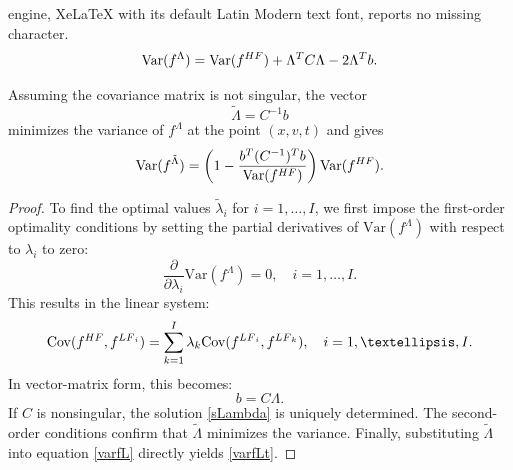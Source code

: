 \documentclass[10pt,a4paper]{amsart}
\newcommand{\Cov}{\mathrm{Cov}}
\newcommand{\Var}{\mathrm{Var}}
\begin{document}
engine, XeLaTeX with its default Latin Modern text font, reports no missing character.
\begin{equation}
\label{varfL}
  \Var{(f^{\Lambda})} = \Var{(f^{\rm HF})} + \Lambda^{\rm T} C\Lambda - 2\Lambda^{\rm T}b.
\end{equation}

\begin{lemma}
  Assuming the covariance matrix is not singular, the vector
  \begin{equation}
  \label{sLambda}
    \tilde{\Lambda} = C^{-1}b
  \end{equation}
  minimizes the variance of $f^{\Lambda}$ at the point $(x, v, t)$ and gives
  \begin{equation}
  \label{varfLt}
    \Var{(f^{\tilde{\Lambda}})} = \left(1 - \frac{b^{\rm T}(C^{-1})^{\rm T}b}{\Var{(f^{\rm HF})}} \right) \Var{(f^{\rm HF})}.
  \end{equation}
\end{lemma}

\begin{proof}
To find the optimal values $\tilde{\lambda}_i$ for \(i = 1, \ldots, I\), we first impose the first-order optimality conditions by setting the partial derivatives of $\Var\left(f^\Lambda\right)$ with respect to $\lambda_i$ to zero:
\begin{equation*}
  \frac{\partial}{\partial \lambda_i} \Var (f^\Lambda) = 0, \quad i = 1, \ldots, I.
\end{equation*}
This results in the linear system:
\begin{equation*}
  \Cov{(f^{\rm HF}, f^{{\rm LF}_i})} = \sum_{k=1}^I \lambda_k \Cov{(f^{{\rm LF}_i}, f^{{\rm LF}_k})}, \quad i = 1, \ldots, I.
\end{equation*}
In vector-matrix form, this becomes:
\begin{equation*}
  b = C {\Lambda}.
\end{equation*}
If $C$ is nonsingular, the solution \eqref{sLambda} is uniquely determined. 
The second-order conditions confirm that $\tilde{\Lambda}$ minimizes the variance. 
Finally, substituting $\tilde{\Lambda}$ into equation \eqref{varfL} directly yields \eqref{varfLt}.
\end{proof}
\end{document}
